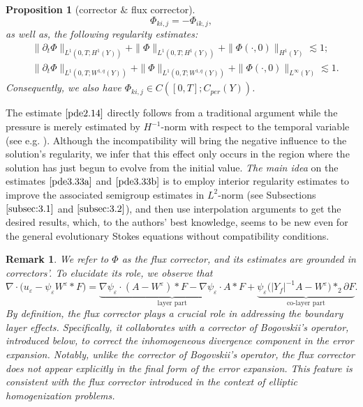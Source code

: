 \documentclass[13pt,CJK]{article}
\theoremstyle{plain}                       %
\newtheorem{remark}[lemma]{Remark}
\newtheorem{proposition}[lemma]{Proposition}
\theoremstyle{remark}
\numberwithin{equation}{section}
\begin{document}
\begin{proposition}[corrector $\&$ flux corrector]
\begin{equation}
 \Phi_{ki,j}=-\Phi_{ik,j},
\end{equation}
as well as, the following regularity estimates:
\begin{subequations}
\begin{align}
&\|\partial_t\Phi\|_{L^1(0,T;H^1(Y))}
+\|\Phi\|_{L^1(0,T;H^1(Y))}
+\|\Phi(\cdot,0)\|_{H^1(Y)}\lesssim 1;\label{pri:3.5a}\\
&\|\partial_t\Phi\|_{L^1(0,T;W^{1,q}
(Y))}+\|\Phi\|_{L^1(0,T;W^{1,q}(Y))}
+\|\Phi(\cdot,0)\|_{L^\infty(Y)}
\lesssim 1.
\label{pri:3.5b}
\end{align}
\end{subequations}
Consequently, we also have $\Phi_{ki,j}\in C([0,T];C_{per}(Y))$.
\end{proposition}

The estimate $\eqref{pde2.14}$ directly follows from
a traditional argument while the pressure is merely estimated by
$H^{-1}$-norm
with respect to the temporal variable (see e.g. \cite{Temam79}). Although
the incompatibility will bring the negative influence to the solution's
regularity,
we infer that this effect only occurs
in the region where the solution has just begun to evolve
from the initial value. \emph{The main idea} on the
estimates $\eqref{pde3.33a}$ and $\eqref{pde3.33b}$ is to
employ interior regularity estimates to improve
the associated semigroup estimates in $L^2$-norm
(see Subsections $\ref{subsec:3.1}$ and $\ref{subsec:3.2}$),
and then use interpolation arguments to get the desired results,
which, to the authors' best knowledge, seems to be new even for
the general evolutionary Stokes equations without compatibility
conditions.

\begin{remark}\label{remark:3.1}
\emph{We refer to $\Phi$ as the flux corrector, and its estimates are grounded in correctors'.
To elucidate its role, we observe that
\begin{equation}\label{}
  \nabla\cdot\big(u_\varepsilon-\psi_\varepsilon W^\varepsilon*F\big)
  =\underbrace{\nabla\psi_\varepsilon\cdot (A-W^\varepsilon)*F
  -\nabla\psi_\varepsilon\cdot A*F}_{\text{layer~part}}
  +\underbrace{\psi_\varepsilon \big(|Y_f|^{-1}A-W^\varepsilon\big)*_2\partial F}_{\text{co-layer~part}}.
\end{equation}
By definition, the flux corrector plays a crucial role in addressing the boundary layer effects. Specifically, it collaborates with a corrector of Bogovskii's operator, introduced below, to correct the inhomogeneous divergence component in the error expansion. Notably, unlike the corrector of Bogovskii's operator, the flux corrector does not appear explicitly in the final form of the error expansion. This feature is consistent with the flux corrector introduced in the context of elliptic homogenization problems. }
\end{remark}
\end{document}
